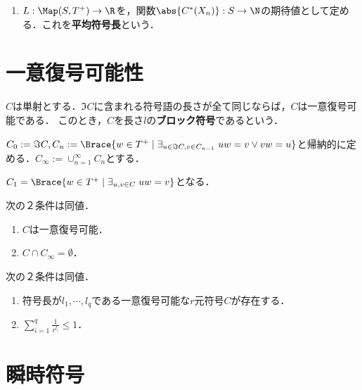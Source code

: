 \documentclass[uplatex,dvipdfmx]{jsreport}
\begin{document}
\begin{definition}\mbox{}
    \begin{enumerate}
        \item $L:\Map(S,T^+)\to\R$を，関数$\abs{C^*(X_n)}:S\to\N$の期待値として定める．これを\textbf{平均符号長}という．
    \end{enumerate}
\end{definition}

\section{一意復号可能性}

\begin{theorem}
    $C$は単射とする．$\Im C$に含まれる符号語の長さが全て同じならば，$C$は一意復号可能である．
    このとき，$C$を長さ$l$の\textbf{ブロック符号}であるという．
\end{theorem}

\begin{definition}
    $C_0:=\Im C,C_n:=\Brace{w\in T^+\mid\exists_{u\in\Im C,v\in C_{n-1}}\;uw=v\lor vw=u}$と帰納的に定める．$C_\infty:=\cup_{n=1}^\infty C_n$とする．
\end{definition}
\begin{remark}
    $C_1=\Brace{w\in T^+\mid\exists_{u,v\in C}\;uw=v}$となる．
\end{remark}

\begin{theorem}
    次の２条件は同値．
    \begin{enumerate}
        \item $C$は一意復号可能．
        \item $C\cap C_\infty=\emptyset$．
    \end{enumerate}
\end{theorem}

\begin{theorem}[McMillan 56]
    次の２条件は同値．
    \begin{enumerate}
        \item 符号長が$l_1,\cdots,l_q$である一意復号可能な$r$元符号$C$が存在する．
        \item $\sum^q_{i=1}\frac{1}{r^{l_i}}\le 1$．
    \end{enumerate}
\end{theorem}

\section{瞬時符号}
\end{document}
